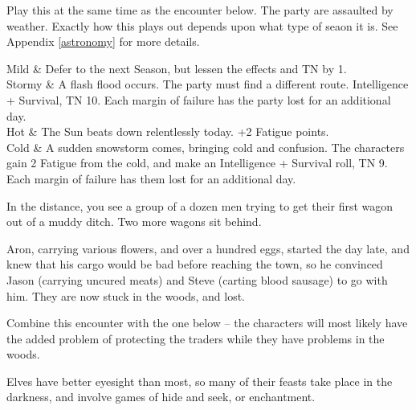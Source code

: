 \begin{multicols}{2}

Play this at the same time as the encounter below.  The party are assaulted by weather.  Exactly how this plays out depends upon what type of seaon it is.  See Appendix \ref{astronomy} for more details.

\vfill\null

\begin{rollchart}

	Mild & Defer to the next Season, but lessen the effects and TN by 1. \\
	Stormy & A flash flood occurs.  The party must find a different route.  Intelligence + Survival, TN 10.  Each margin of failure has the party lost for an additional day. \\
	Hot & The Sun beats down relentlessly today.  +2 Fatigue points. \\
	Cold & A sudden snowstorm comes, bringing cold and confusion.  The characters gain 2 Fatigue from the cold, and make an Intelligence + Survival roll, TN 9.  Each margin of failure has them lost for an additional day.

\end{rollchart}


\begin{boxtext}
	In the distance, you see a group of a dozen men trying to get their first wagon out of a muddy ditch.  Two more wagons sit behind.
\end{boxtext}

Aron, carrying various flowers, and over a hundred eggs, started the day late, and knew that his cargo would be bad before reaching the town, so he convinced Jason (carrying uncured meats) and Steve (carting blood sausage) to go with him.  They are now stuck in the woods, and lost.

Combine this encounter with the one below -- the characters will most likely have the added problem of protecting the traders while they have problems in the woods.


\humantrader


Elves have better eyesight than most, so many of their feasts take place in the darkness, and involve games of hide and seek, or enchantment.


\end{multicols}
